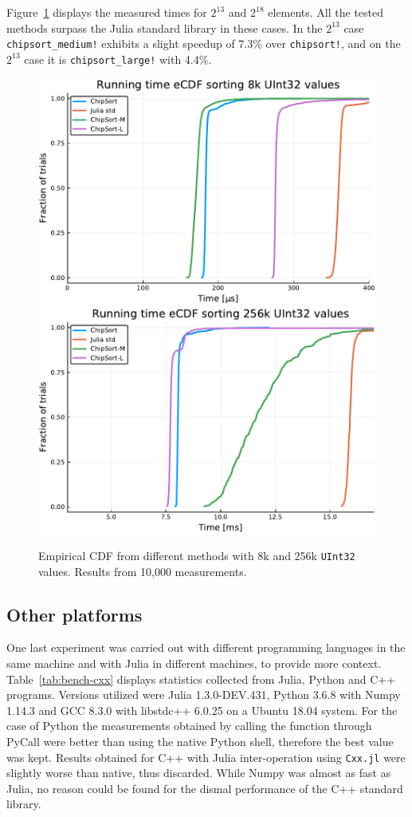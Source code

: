 \documentclass{juliacon}
\begin{document}
Figure~\ref{fig:bench-cdf} displays the measured times for $2^{13}$ and $2^{18}$ elements. All the tested \chipsort methods surpass the Julia standard library in these cases. In the $2^{13}$ case {\tt chipsort\_medium!} exhibits a slight speedup of 7.3\% over {\tt chipsort!}, and on the $2^{13}$ case it is {\tt chipsort\_large!} with 4.4\%.

\begin{figure}[htb]
  \centerline{\includegraphics[width=0.4\linewidth]{fig/chipsort-bench-8k.pdf}
    \includegraphics[width=0.4\linewidth]{fig/chipsort-bench-256k.pdf}}
\caption{Empirical CDF from different methods with 8k and 256k {\tt UInt32} values. Results from 10,000 measurements.}
\label{fig:bench-cdf}
\end{figure}

\subsection{Other platforms}
One last experiment was carried out with different programming languages in the same machine and with Julia in different machines, to provide more context. Table~\ref{tab:bench-cxx} displays statistics collected from Julia, Python and C++ programs. Versions utilized were Julia 1.3.0-DEV.431, Python 3.6.8 with Numpy 1.14.3 and GCC 8.3.0 with libstdc++ 6.0.25 on a Ubuntu 18.04 system. For the case of Python the measurements obtained by calling the function through PyCall were better than using the native Python shell, therefore the best value was kept. Results obtained for C++ with Julia inter-operation using {\tt Cxx.jl} were slightly worse than native, thus discarded. While Numpy was almost as fast as Julia, no reason could be found for the dismal performance of the C++ standard library.
\end{document}
